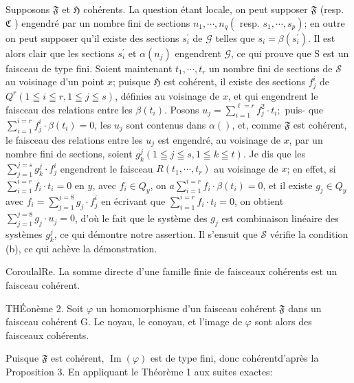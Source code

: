 Supposons $\mathfrak{F}$ et $\mathfrak{H}$ cohérents. La question étant locale, on peut supposer $\mathfrak{F}$ (resp. $\mathfrak{C}$ ) engendré par un nombre fini de sections $n_{1}, \cdots, n_{q}\left(\right.$ resp. $\left.s_{1}, \cdots, s_{p}\right)$; en outre on peut supposer qu'il existe des sections $s_{i}^{\prime}$ de $\mathcal{G}$ telles que $s_{i}=\beta\left(s_{i}^{\prime}\right)$. Il est alors clair que les sections $s_{i}^{\prime}$ et $\alpha\left(n_{j}\right)$ engendrent $\mathcal{G}$, ce qui prouve que $\mathrm{S}$ est un faisceau de type fini. Soient maintenant $t_{1}, \cdots, t_{r}$ un nombre fini de sections de $\mathcal{S}$ au voisinage d'un point $x$; puisque $\mathfrak{H}$ est cohérent, il existe des sections $f_{j}^{i}$ de $Q^{r}(1 \leqq i \leqq r, 1 \leqq j \leqq s)$, définies au voisinage de $x$, et qui engendrent le faisceau des relations entre les $\beta\left(t_{i}\right)$. Posons $u_{j}=\sum_{i=1}^{\ell=r} f_{j}^{2} \cdot t_{i} ;$ puis- que $\sum_{i=1}^{i=r} f_{j}^{i} \cdot \beta\left(t_{i}\right)=0$, les $u_{j}$ sont contenus dans $\alpha(\mathfrak{})$, et, comme $\mathfrak{F}$ est cohérent, le faisceau des relations entre les $u_{j}$ est engendré, au voisinage de $x$, par un nombre fini de sections, soient $g_{k}^{j}(1 \leqq j \leqq s, 1 \leqq k \leqq t) .$ Je dis que les $\sum_{j=1}^{j=s} g_{k}^{j} \cdot f_{j}^{i}$ engendrent le faisceau $R\left(t_{1}, \cdots, t_{r}\right)$ au voisinage de $x$; en effet, si $\sum_{i=1}^{i=r} f_{i} \cdot t_{i}=0$ en $y$, avec $f_{i} \in Q_{y}$, on $a \sum_{i=1}^{i=r} f_{i} \cdot \beta\left(t_{i}\right)=0$, et il existe $g_{j} \in Q_{y}$ avec $f_{i}=\sum_{j=1}^{j=8} g_{j} \cdot f_{j}^{i}$ en écrivant que $\sum_{i=1}^{i=r} f_{i} \cdot t_{i}=0$, on obtient $\sum_{j=1}^{j=8} g_{j} \cdot u_{j}=0$, d'où le fait que le système des $g_{j}$ est combinaison linéaire des systèmes $g_{k}^{j}$, ce qui démontre notre assertion. Il s'ensuit que $\mathcal{S}$ vérifie la condition (b), ce qui achève la démonstration.

CoroulalRe. La somme directe d'une famille finie de faisceaux cohérents est un faisceau cohérent.

THÉonème 2. Soit $\varphi$ un homomorphisme d'un faisceau cohérent $\mathfrak{F}$ dans un faisceau cohérent G. Le noyau, le conoyau, et l'image de $\varphi$ sont alors des faisceaux cohérents.

Puisque $\mathfrak{F}$ est cohérent, $\operatorname{Im}(\varphi)$ est de type fini, donc cohérentd'après la Proposition $3 .$ En appliquant le Théorème 1 aux suites exactes:

